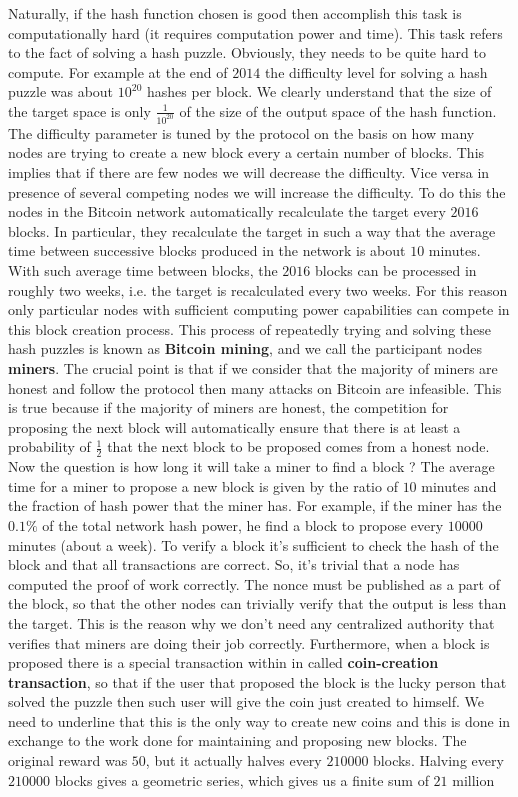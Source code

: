 Naturally, if the hash function chosen is good then accomplish this task is computationally hard (it requires computation power and time). This task refers to the fact of solving a hash puzzle. Obviously, they needs to be quite hard to compute. For example at the end of $2014$ the difficulty level for solving a hash puzzle was about $10^{20}$ hashes per block. We clearly understand that the size of the target space is only $\frac{1}{10^{20}}$ of the size of the output space of the hash function. The difficulty parameter is tuned by the protocol on the basis on how many nodes are trying to create a new block every a certain number of blocks. This implies that if there are few nodes we will decrease the difficulty. Vice versa in presence of several competing nodes we will increase the difficulty. To do this the nodes in the Bitcoin network automatically recalculate the target every $2016$ blocks. In particular, they recalculate the target in such a way that the average time between successive blocks produced in the network is about $10$ minutes. With such average time between blocks, the $2016$ blocks can be processed in roughly two weeks, i.e. the target is recalculated every two weeks. For this reason only particular nodes with sufficient computing power capabilities can compete in this block creation process. This process of repeatedly trying and solving these hash puzzles is known as \textbf{Bitcoin mining}, and we call the participant nodes \textbf{miners}. The crucial point is that if we consider that the majority of miners are honest and follow the protocol then many attacks on Bitcoin are infeasible. This is true because if the majority of miners are honest, the competition for proposing the next block will automatically ensure that there is at least a probability of $\frac{1}{2}$ that the next block to be proposed comes from a honest node. Now the question is how long it will take a miner to find a block ? The average time for a miner to propose a new block is given by the ratio of $10$ minutes and the fraction of hash power that the miner has. For example, if the miner has the $0.1 \%$ of the total network hash power, he find a block to propose every $10000$ minutes (about a week). To verify a block it's sufficient to check the hash of the block and that all transactions are correct. So, it's trivial that a node has computed the proof of work correctly. The nonce must be published as a part of the block, so that the other nodes can trivially verify that the output is less than the target. This is the reason why we don't need any centralized authority that verifies that miners are doing their job correctly. Furthermore, when a block is proposed there is a special transaction within in called \textbf{coin-creation transaction}, so that if the user that proposed the block is the lucky person that solved the puzzle then such user will give the coin just created to himself. We need to underline that this is the only way to create new coins and this is done in exchange to the work done for maintaining and proposing new blocks. The original reward was $50$, but it actually halves every $210000$ blocks. Halving every $210000$ blocks gives a geometric series, which gives us a finite sum of $21$ million 